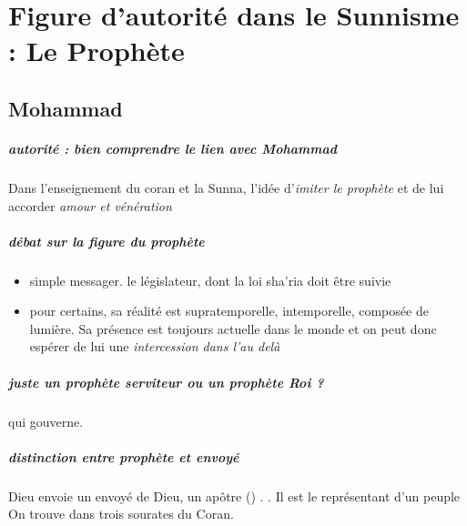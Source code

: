 \chapter{Figure d'autorité dans le Sunnisme : Le Prophète}


\section{Mohammad}
\paragraph{autorité : bien comprendre le lien avec Mohammad} Dans l'enseignement du coran et la Sunna, l'idée d'\textit{imiter le prophète} et de lui accorder \textit{amour et vénération}

\paragraph{débat sur la figure du prophète} 

\begin{itemize}
    \item simple messager. le législateur, dont la loi sha'ria doit être suivie
    \item pour certains, sa réalité est supratemporelle, intemporelle, composée de lumière. Sa présence est toujours actuelle dans le monde et on peut donc espérer de lui une \textit{intercession dans l'au delà}
\end{itemize}

\paragraph{juste un prophète serviteur ou un prophète Roi ?} qui gouverne. 

\paragraph{distinction entre prophète et envoyé} 
\paragraph{\Rasul}  Dieu envoie un envoyé de Dieu, un apôtre (\Rasul) . . Il est le représentant d'un peuple
On trouve {\Rasul} dans trois sourates du Coran.


